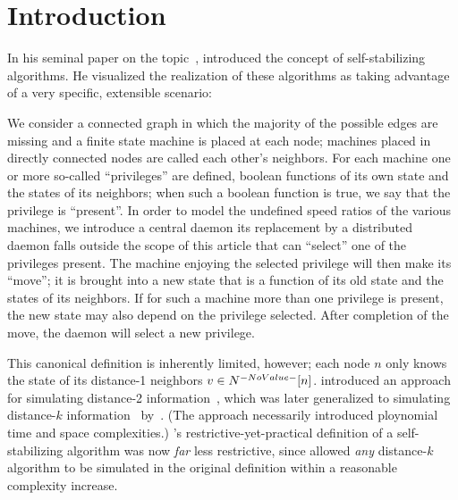 \section{Introduction}
\label{sec:introduction}
In his seminal paper on the topic~\autocite{Dijkstra:1974:SSS:361179.361202},
  \citeauthor{Dijkstra:1974:SSS:361179.361202} introduced the concept of
  self-stabilizing algorithms.
He visualized the realization of these algorithms as taking advantage of
  a very specific, extensible scenario:
\begin{displayquote}
  We consider a connected graph in which
    the majority of the possible edges are missing and
    a finite state machine is placed at each node;
    machines placed in directly connected nodes are called each other's neighbors.
  For each machine one or more so-called \enquote{privileges} are defined,
    \ie boolean functions of its own state and the states of its neighbors;
    when such a boolean function is true,
    we say that the privilege is \enquote{present}.
  In order to model the undefined speed ratios of the various machines,
    we introduce a central daemon \Dash
    its replacement by a distributed daemon falls outside the scope of this article \Dash
    that can \enquote{select} one of the privileges present.
  The machine enjoying the selected privilege will then make its \enquote{move};
    \ie it is brought into a new state that is a function of
    its old state and the states of its neighbors.
  If for such a machine more than one privilege is present,
    the new state may also depend on the privilege selected.
  After completion of the move, the daemon will select a new privilege.
\end{displayquote}
This canonical definition is inherently limited, however;
  each node $n$ only knows the state of its distance-1 neighbors $v \in \ClosedNeighborhood{n}$.
\citeauthor{gairing:distance-2} introduced an approach for
  simulating distance-2 information~\autocite{gairing:distance-2},
  which was later generalized to simulating distance-$k$
  information~\autocite{goddard:ssa--k-distance} by~\citeauthor{goddard:ssa--k-distance}.
  (The approach necessarily introduced ploynomial time and space complexities.)
\citeauthor{Dijkstra:1974:SSS:361179.361202}'s restrictive-yet-practical definition
  of a self-stabilizing algorithm
  was now \emph{far} less restrictive,
  since \citeauthor{goddard:ssa--k-distance} allowed \emph{any} distance-$k$ algorithm
  to be simulated in the original definition within a reasonable complexity increase.

